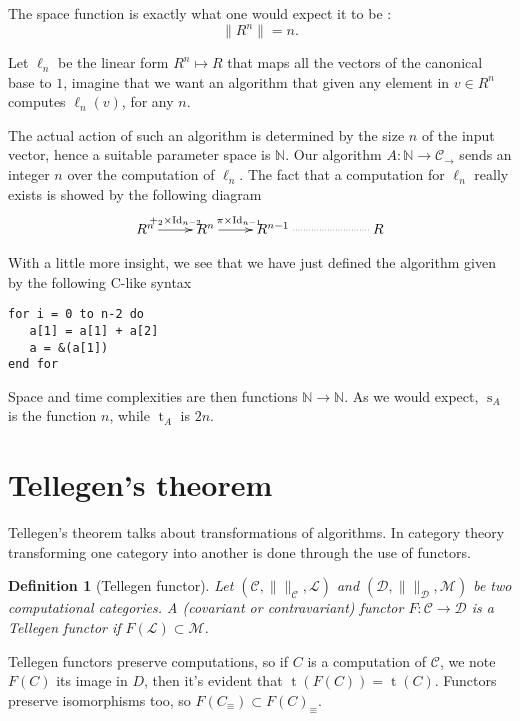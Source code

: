 \documentclass{article}
\newcommand{\cat}[1]{\mathscr{#1}}
\newcommand{\C}{\cat{C}}
\newcommand{\D}{\cat{D}}
\renewcommand{\L}{\cat{L}}
\newcommand{\size}[1]{\lVert#1\rVert}
\DeclareMathOperator{\Id}{Id}
\newcommand{\N}{\mathbb{N}}
\newcommand{\ra}{\rightarrow}
\DeclareMathOperator{\Time}{t}
\DeclareMathOperator{\Space}{s}
\newtheorem{definition}{Definition}
\begin{document}
  The space function is exactly what one would expect it to be :
  \begin{equation}
    \size{R^n} = n \text{.}
  \end{equation}
  
  Let $\ell_n$ be the linear form $R^n\mapsto R$ that maps all the
  vectors of the canonical base to $1$, imagine that we want an
  algorithm that given any element in $v\in R^n$ computes $\ell_n(v)$,
  for any $n$.

  The actual action of such an algorithm is determined by the size $n$
  of the input vector, hence a suitable parameter space is $\N$. Our
  algorithm $A:\N\ra\C_\ra$ sends an integer $n$ over the computation
  of $\ell_n$. The fact that a computation for $\ell_n$ really exists
  is showed by the following diagram
  \[\xymatrix{
    R^n\ar[r]^{+_2\times{\Id_{n-2}}} & R^n\ar[r]^{\pi\times{\Id_{n-1}}} &
    R^{n-1} \ar@{.}[rr] && R
  }\]
  
  With a little more insight, we see that we have just defined the
  algorithm given by the following C-like syntax
  \begin{center}
    \begin{minipage}{0.7\textwidth}
\begin{verbatim}
for i = 0 to n-2 do
   a[1] = a[1] + a[2]
   a = &(a[1])
end for
\end{verbatim}
    \end{minipage}
  \end{center}

  Space and time complexities are then functions $\N\ra\N$. As we
  would expect, $\Space_A$ is the function $n$, while $\Time_A$ is
  $2n$.


  \section{Tellegen's theorem}

  Tellegen's theorem talks about transformations of algorithms. In
  category theory transforming one category into another is done
  through the use of functors.

  \begin{definition}[Tellegen functor]
    Let $(\C,\size{}_{\C},\L)$ and $(\D,\size{}_{\D},\cat{M})$ be two
    computational categories. A (covariant or contravariant) functor
    $F:\C\ra\D$ is a \emph{Tellegen functor} if $F(\L)\subset\cat{M}$.
  \end{definition}

  Tellegen functors preserve computations, so if $C$ is a computation
  of $\C$, we note $F(C)$ its image in $D$, then it's evident that
  $\Time(F(C)) = \Time(C)$. Functors preserve isomorphisms too, so
  $F(C_\equiv) \subset F(C)_\equiv$.
\end{document}
